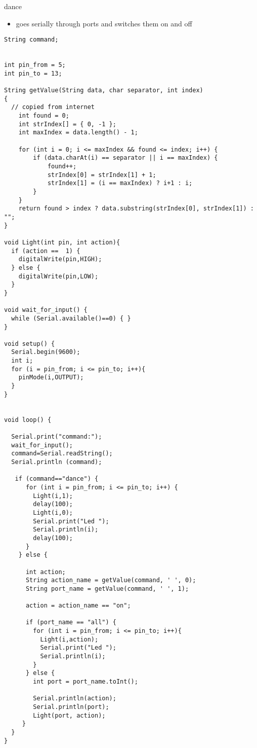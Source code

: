 dance

\begin{itemize}
\item
  goes serially through ports and switches them on and off
\end{itemize}

\begin{lstlisting}
String command;


int pin_from = 5;
int pin_to = 13;

String getValue(String data, char separator, int index)
{
  // copied from internet
    int found = 0;
    int strIndex[] = { 0, -1 };
    int maxIndex = data.length() - 1;

    for (int i = 0; i <= maxIndex && found <= index; i++) {
        if (data.charAt(i) == separator || i == maxIndex) {
            found++;
            strIndex[0] = strIndex[1] + 1;
            strIndex[1] = (i == maxIndex) ? i+1 : i;
        }
    }
    return found > index ? data.substring(strIndex[0], strIndex[1]) : "";
}

void Light(int pin, int action){
  if (action ==  1) {
    digitalWrite(pin,HIGH);
  } else {
    digitalWrite(pin,LOW);
  }
}

void wait_for_input() {
  while (Serial.available()==0) { } 
}

void setup() {
  Serial.begin(9600);
  int i;
  for (i = pin_from; i <= pin_to; i++){
    pinMode(i,OUTPUT);
  }
}


void loop() {
 
  Serial.print("command:");
  wait_for_input();
  command=Serial.readString();  
  Serial.println (command);

   if (command=="dance") {     
      for (int i = pin_from; i <= pin_to; i++) {
        Light(i,1);
        delay(100);
        Light(i,0);    
        Serial.print("Led ");
        Serial.println(i);
        delay(100);
      }
    } else {
      
      int action;
      String action_name = getValue(command, ' ', 0);
      String port_name = getValue(command, ' ', 1);

      action = action_name == "on";
    
      if (port_name == "all") {
        for (int i = pin_from; i <= pin_to; i++){
          Light(i,action);   
          Serial.print("Led ");
          Serial.println(i);
        }
      } else {
        int port = port_name.toInt();

        Serial.println(action);
        Serial.println(port);
        Light(port, action);
     }
  }
}
\end{lstlisting}

